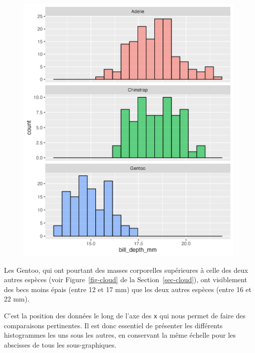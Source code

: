 \documentclass[
  letterpaper,
  DIV=11,
  numbers=noendperiod]{scrreprt}
\begin{document}
\begin{figure}[H]

{\centering \includegraphics{./03-visualization_files/figure-pdf/unnamed-chunk-69-1.png}

}

\end{figure}

Les Gentoo, qui ont pourtant des masses corporelles supérieures à celle
des deux autres espèces (voir Figure~\ref{fig-cloud} de la
Section~\ref{sec-cloud}), ont visiblement des becs moins épais (entre 12
et 17 mm) que les deux autres espèces (entre 16 et 22 mm).

\begin{tcolorbox}[enhanced jigsaw, bottomtitle=1mm, title=\textcolor{quarto-callout-important-color}{\faExclamation}\hspace{0.5em}{Important}, breakable, opacitybacktitle=0.6, coltitle=black, opacityback=0, toprule=.15mm, toptitle=1mm, titlerule=0mm, colback=white, rightrule=.15mm, arc=.35mm, leftrule=.75mm, bottomrule=.15mm, left=2mm, colframe=quarto-callout-important-color-frame, colbacktitle=quarto-callout-important-color!10!white]
C'est la position des données le long de l'axe des \texttt{x} qui nous
permet de faire des comparaisons pertinentes. Il est donc essentiel de
présenter les différents histogrammes les uns sous les autres, en
conservant la même échelle pour les abscisses de tous les
sous-graphiques.
\end{tcolorbox}
\end{document}
